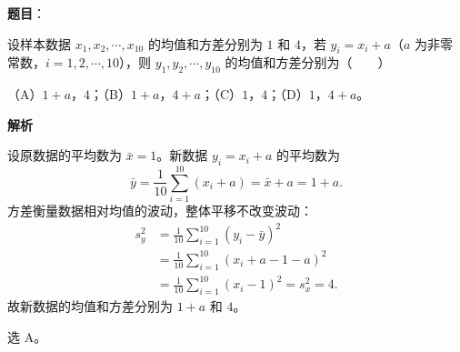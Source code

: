 \begin{answer}

\textbf{题目}：

设样本数据 $x_1,x_2,\cdots,x_{10}$ 的均值和方差分别为 $1$ 和 $4$，若 $y_i=x_i+a$（$a$ 为非零常数，$i=1,2,\cdots,10$），则 $y_1,y_2,\cdots,y_{10}$ 的均值和方差分别为\mbox{（　　）}

（A）$1+a$，$4$；（B）$1+a$，$4+a$；（C）$1$，$4$；（D）$1$，$4+a$。

\textbf{解析}

设原数据的平均数为 $\bar x=1$。新数据 $y_i=x_i+a$ 的平均数为
\nopagebreak[4]
\[\bar y=\frac1{10}\sum_{i=1}^{10}(x_i+a)=\bar x+a=1+a.\]
方差衡量数据相对均值的波动，整体平移不改变波动：
\nopagebreak[4]
\[\begin{aligned}
s_y^2&=\frac1{10}\sum_{i=1}^{10}(y_i-\bar y)^2\\
&=\frac1{10}\sum_{i=1}^{10}(x_i+a-1-a)^2\\
&=\frac1{10}\sum_{i=1}^{10}(x_i-1)^2=s_x^2=4.
\end{aligned}\]
故新数据的均值和方差分别为 $1+a$ 和 $4$。

选 A。


\end{answer}
